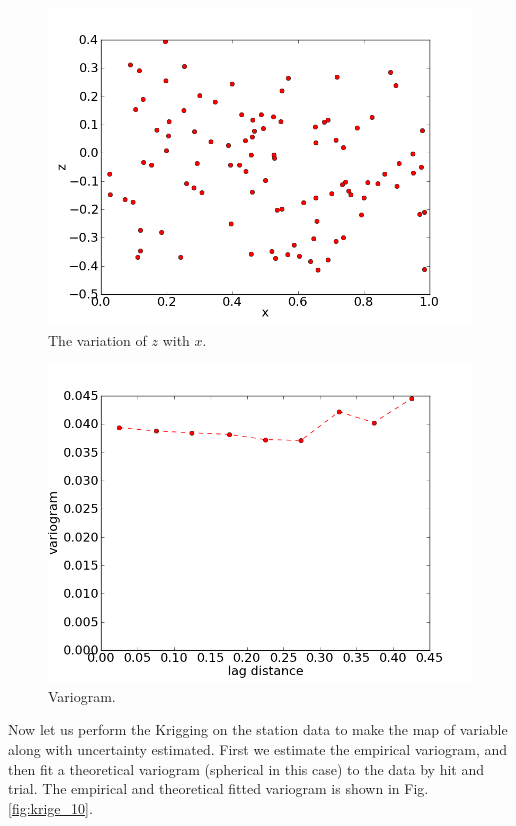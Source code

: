 \documentclass[10pt]{book}
\begin{document}
\beforefig
\begin{figure}[h!]
  \centering
    \includegraphics[scale=0.5]{images/krige_8.png}
  \caption{The variation of $z$ with $x$.}
   \label{fig:krige_8}
\end{figure}
\afterfig

\beforefig
\begin{figure}[h!]
  \centering
    \includegraphics[scale=0.5]{images/krige_9.png}
  \caption{Variogram.}
   \label{fig:krige_9}
\end{figure}
\afterfig

Now let us perform the Krigging on the station data to make the map of variable along with uncertainty estimated. First we estimate the empirical variogram, and then fit a theoretical variogram (spherical in this case) to the data by hit and trial. The empirical and theoretical fitted variogram is shown in Fig. \ref{fig:krige_10}. 
\end{document}
